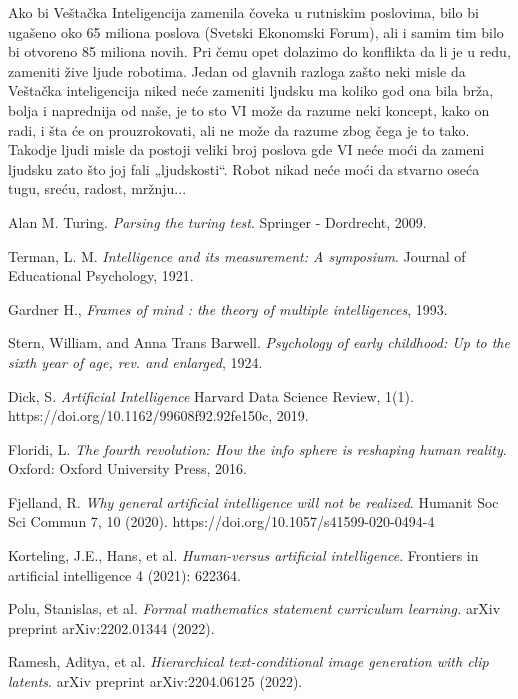 \documentclass[a4paper]{article}
\begin{document}
Ako bi Veštačka Inteligencija zamenila čoveka u rutniskim poslovima, bilo bi ugašeno oko 65 miliona poslova (Svetski Ekonomski Forum), ali i samim tim bilo bi otvoreno 85 miliona novih. Pri čemu opet dolazimo do konflikta da li je u redu, zameniti žive ljude robotima. Jedan od glavnih razloga zašto neki misle da Veštačka inteligencija niked neće zameniti ljudsku ma koliko god ona bila brža, bolja i naprednija od naše, je to sto VI može da razume neki koncept, kako on radi, i šta će on prouzrokovati, ali ne može da razume zbog čega je to tako. Takodje ljudi misle da postoji veliki broj poslova gde VI neće moći da zameni ljudsku zato što joj fali „ljudskosti“. Robot nikad neće moći da stvarno oseća tugu, sreću, radost, mržnju...

\begin{thebibliography}{9}

 Alan M. Turing. \emph{Parsing the turing test}. Springer - Dordrecht, 2009.

Terman, L. M. \emph{Intelligence and its measurement: A symposium}. Journal of Educational Psychology, 1921.

 Gardner H., \emph{Frames of mind : the theory of multiple intelligences}, 1993.

 Stern, William, and Anna Trans Barwell. \emph{Psychology of early childhood: Up to the sixth year of age, rev. and enlarged}, 1924.

Dick, S. \emph{Artificial Intelligence} Harvard Data Science Review, 1(1). https://doi.org/10.1162/99608f92.92fe150c, 2019.

 Floridi, L. \emph{The fourth revolution: How the info sphere is reshaping human reality}. Oxford: Oxford University Press, 2016.

Fjelland, R. \emph{Why general artificial intelligence will not be realized}. Humanit Soc Sci Commun 7, 10 (2020). https://doi.org/10.1057/s41599-020-0494-4

Korteling, J.E., Hans, et al. \emph{Human-versus artificial intelligence}. Frontiers in artificial intelligence 4 (2021): 622364.

 Polu, Stanislas, et al. \emph{Formal mathematics statement curriculum learning.} arXiv preprint arXiv:2202.01344 (2022).

 Ramesh, Aditya, et al. \emph{Hierarchical text-conditional image generation with clip latents}. arXiv preprint arXiv:2204.06125 (2022).


\end{thebibliography}
\end{document}
